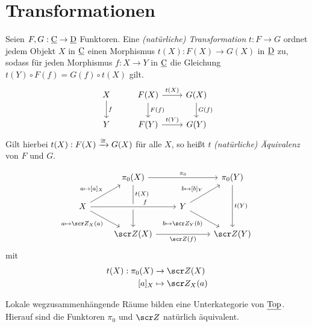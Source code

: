 \section{Transformationen}


\begin{df}
	Seien $F, G: \underline{\mathrm{C}} \to \underline{\mathrm{D}}$ Funktoren.
	Eine \emph{(natürliche) Transformation} $t: F \to G$ ordnet jedem Objekt $X$ in $\underline{\mathrm{C}}$ einen Morphismus $t(X): F(X) \to G(X)$ in $\underline{\mathrm{D}}$ zu, sodass für jeden Morphismus $f: X \to Y$ in $\underline{\mathrm{C}}$ die Gleichung $t(Y) \circ F(f) = G(f) \circ t(X)$ gilt.
	\[
		\begin{tikzcd}
			X \arrow{d}{f} & F(X) \arrow{d}{F(f)} \arrow{r}{t(X)} & G(X) \arrow{d}{G(f)} \\
			Y & F(Y) \arrow{r}{t(Y)} & G(Y)
		\end{tikzcd}
	\]
	Gilt hierbei $t(X) : F(X) \xrightarrow{\cong} G(X)$ für alle $X$, so heißt $t$ \emph{(natürliche) Äquivalenz} von $F$ und $G$.
\end{df}

\begin{ex}
	\[
		\begin{tikzcd}
			~ & \pi_0(X) \arrow{dd}[yshift=5mm]{t(X)} \arrow{rr}{\pi_0} & & \pi_0(Y) \arrow{dd}{t(Y)} \\
			X \arrow{ur}{a\mapsto [a]_X} \arrow{dr}[swap]{a\mapsto \scr Z_X(a)} \arrow[crossing over]{rr}[xshift=5mm]{f} & & Y \arrow{ru}{b\mapsto[b]_Y} \arrow{dr}[swap]{b\mapsto \scr Z_Y(b)} & \\
			& \scr Z(X) \arrow{rr}[below]{\scr Z(f)} && \scr Z(Y)
		\end{tikzcd}
	\]
	mit
	\begin{align*}
		t(X): \pi_0(X) &\to \scr Z(X) \\
		[a]_X &\mapsto \scr Z_X(a)
	\end{align*}
	\begin{note}
		Lokale wegzusammenhängende Räume bilden eine Unterkategorie von $\underline{\mathrm{Top}}$.
		Hierauf sind die Funktoren $\pi_0$ und $\scr Z$ natürlich äquivalent.
	\end{note}
\end{ex}



